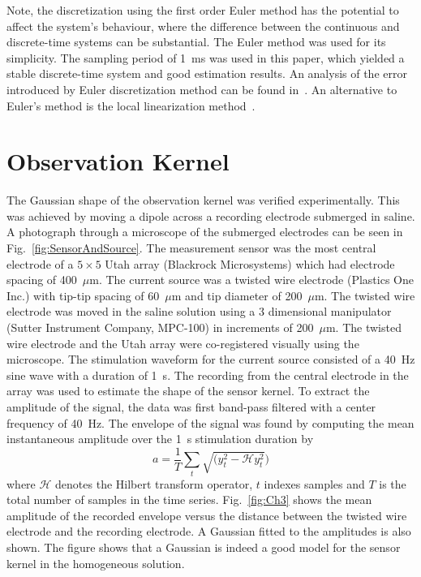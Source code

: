\documentclass[review,authoryear,3p]{elsarticle}
\begin{document}
Note, the discretization using the first order Euler method has the potential to affect the system's behaviour, where the difference between the continuous and discrete-time systems can be substantial. The Euler method was used for its simplicity. The sampling period of 1~ms was used in this paper, which yielded a stable discrete-time system and good estimation results. An analysis of the error introduced by Euler discretization method can be found in~\citet{Butcher2008}. An alternative to Euler's method is the local linearization method~\citep{Ozaki1994}.

\section{Observation Kernel}\label{App:ObsKernelExperiment}
The Gaussian shape of the observation kernel was verified experimentally. This was achieved by moving a dipole across a recording electrode submerged in saline. A photograph through a microscope of the submerged electrodes can be seen in Fig.~\ref{fig:SensorAndSource}. The measurement sensor was the most central electrode of a $5\times5$ Utah array (Blackrock Microsystems) which had electrode spacing of 400~$\mu$m. The current source was a twisted wire electrode (Plastics One Inc.) with tip-tip spacing of 60~$\mu$m and tip diameter of 200~$\mu$m. The twisted wire electrode was moved in the saline solution using a 3 dimensional manipulator (Sutter Instrument Company, MPC-100) in increments of 200~$\mu$m. The twisted wire electrode and the Utah array were co-registered visually using the microscope.
The stimulation waveform for the current source consisted of a 40~Hz sine wave with a duration of 1~s. The recording from the central electrode in the array was used to estimate the shape of the sensor kernel. To extract the amplitude of the signal, the data was first band-pass filtered with a center frequency of 40~Hz. The envelope of the signal was found by computing the mean instantaneous amplitude over the 1~s stimulation duration by
\begin{equation}
	a = \frac{1}{T}\sum_t{\sqrt{(y_t^2-\mathcal{H}y_t^2})}
\end{equation}
where $\mathcal{H}$ denotes the Hilbert transform operator, $t$ indexes samples and $T$ is the total number of samples in the time series. Fig.~\ref{fig:Ch3} shows the mean amplitude of the recorded envelope versus the distance between the twisted wire electrode and the recording electrode. A Gaussian fitted to the amplitudes is also shown. The figure shows that a Gaussian is indeed a good model for the sensor kernel in the homogeneous solution.
\end{document}

